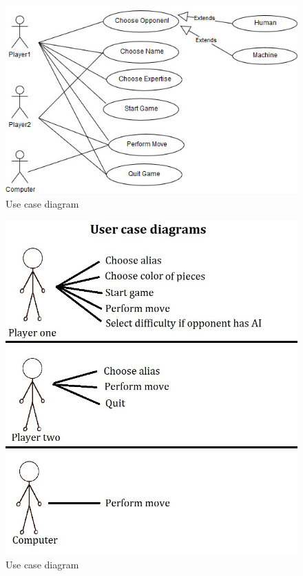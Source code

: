 \documentclass{article}
\begin{document}
\begin{figure}[h]
		\includegraphics*[scale=0.8]{ChessUCD}
	\caption{Use case diagram }
	
\end{figure}

\begin{figure}[h]
		\includegraphics*[scale=0.8]{User_case_diagrams}
	\caption{Use case diagram }
	
\end{figure}
\end{document}
